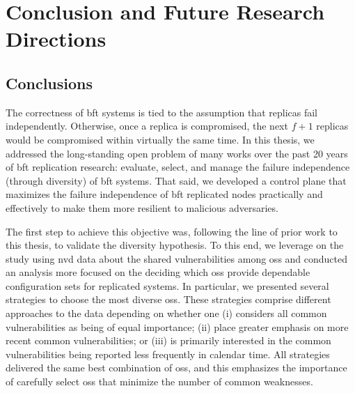 \chapter{Conclusion and Future Research Directions}
\label{chap:conclusion}

\section{Conclusions}
The correctness of \gls{bft} systems is tied to the assumption that replicas fail independently. 
Otherwise, once a replica is compromised, the next $f+1$ replicas would be compromised within virtually the same time.
In this thesis, we addressed the long-standing open problem of many works over the past 20 years of \gls{bft} replication research: evaluate, select, and manage the failure independence (through diversity) of \gls{bft} systems.
That said, we developed a control plane that maximizes the failure independence of \gls{bft} replicated nodes practically and effectively to make them more resilient to malicious adversaries.


The first step to achieve this objective was, following the line of prior work to this thesis, to validate the diversity hypothesis.  
To this end, we leverage on the study using \gls{nvd} data about the shared vulnerabilities among \glspl{os} and conducted an analysis more focused on the deciding which \glspl{os} provide dependable configuration sets for replicated systems.
In particular, we presented several strategies to choose the most diverse \glspl{os}.
These strategies comprise different approaches to the data depending on whether one (i) considers all common vulnerabilities as being of equal importance; (ii) place greater emphasis on more recent common vulnerabilities; or (iii) is primarily interested in the common vulnerabilities being reported less frequently in calendar time.
All strategies delivered the same best combination of \glspl{os}, and this emphasizes the importance of carefully select \glspl{os} that minimize the number of common weaknesses.


